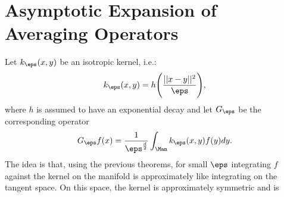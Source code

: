 \section{Asymptotic Expansion of Averaging Operators}
Let $k_\eps(x,y)$ be an isotropic kernel, i.e.:
\begin{equation*}
k_\eps(x,y)=h\Bigg(\frac{||x-y||^2}{\eps} \Bigg),
\end{equation*}
where $h$ is assumed to have an exponential decay and let $G_\eps$ be the corresponding operator
\begin{equation*}
G_\eps f(x)=\frac{1}{\eps^\frac{d}{2}}\int_\Man k_\eps(x,y)f(y)dy.
\end{equation*}
The idea is that, using the previous theorems, for small $\eps$ integrating $f$ against the kernel on the manifold is approximately like integrating on the tangent space. On this space, the kernel is approximately symmetric and is 

